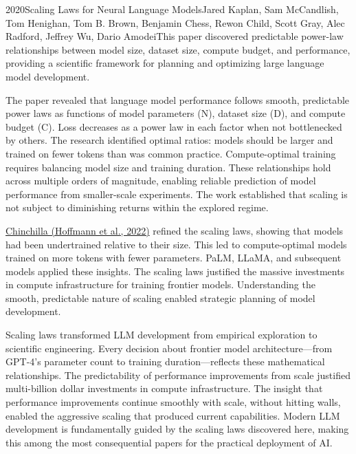 
\begin{papersummary}{2020}{Scaling Laws for Neural Language Models}{Jared Kaplan, Sam McCandlish, Tom Henighan, Tom B. Brown, Benjamin Chess, Rewon Child, Scott Gray, Alec Radford, Jeffrey Wu, Dario Amodei}{This paper discovered predictable power-law relationships between model size, dataset size, compute budget, and performance, providing a scientific framework for planning and optimizing large language model development.}

The paper revealed that language model performance follows smooth, predictable power laws as functions of model parameters (N), dataset size (D), and compute budget (C). Loss decreases as a power law in each factor when not bottlenecked by others. The research identified optimal ratios: models should be larger and trained on fewer tokens than was common practice. Compute-optimal training requires balancing model size and training duration. These relationships hold across multiple orders of magnitude, enabling reliable prediction of model performance from smaller-scale experiments. The work established that scaling is not subject to diminishing returns within the explored regime.

\hyperref[paper:hoffmann-2022]{Chinchilla (Hoffmann et al., 2022)} refined the scaling laws, showing that models had been undertrained relative to their size. This led to compute-optimal models trained on more tokens with fewer parameters. PaLM, LLaMA, and subsequent models applied these insights. The scaling laws justified the massive investments in compute infrastructure for training frontier models. Understanding the smooth, predictable nature of scaling enabled strategic planning of model development.

Scaling laws transformed LLM development from empirical exploration to scientific engineering. Every decision about frontier model architecture—from GPT-4's parameter count to training duration—reflects these mathematical relationships. The predictability of performance improvements from scale justified multi-billion dollar investments in compute infrastructure. The insight that performance improvements continue smoothly with scale, without hitting walls, enabled the aggressive scaling that produced current capabilities. Modern LLM development is fundamentally guided by the scaling laws discovered here, making this among the most consequential papers for the practical deployment of AI.

\end{papersummary}
